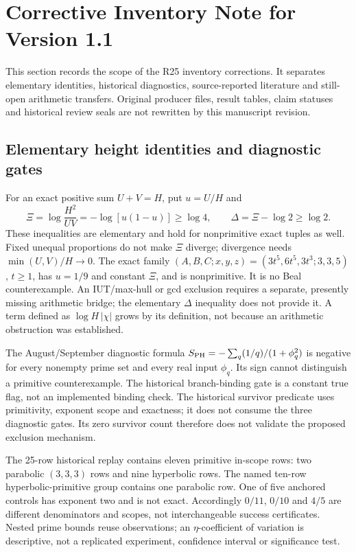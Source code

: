 \documentclass[11pt,a4paper]{article}
\begin{document}
\section{Corrective Inventory Note for Version 1.1}
\label{sec:inventory-corrections}

This section records the scope of the R25 inventory corrections.
It separates elementary identities, historical diagnostics,
source-reported literature and still-open arithmetic transfers.
Original producer files, result tables, claim statuses and historical
review seals are not rewritten by this manuscript revision.

\subsection{Elementary height identities and diagnostic gates}
For an exact positive sum $U+V=H$, put $u=U/H$ and
\[
 \Xi=\log\frac{H^2}{UV}=-\log[u(1-u)]\ge\log4,\qquad
 \Delta=\Xi-\log2\ge\log2.
\]
These inequalities are elementary and hold for nonprimitive exact
tuples as well. Fixed unequal proportions do not make $\Xi$ diverge;
divergence needs $\min(U,V)/H\to0$.
The exact family $(A,B,C;x,y,z)=(3t^5,6t^5,3t^3;3,3,5)$,
$t\ge1$, has $u=1/9$ and constant $\Xi$, and is nonprimitive.
It is no Beal counterexample.
An IUT/max-hull or gcd exclusion requires a separate, presently
missing arithmetic bridge; the elementary $\Delta$ inequality does
not provide it. A term defined as $\log H\,|\chi|$ grows by its
definition, not because an arithmetic obstruction was established.

The August/September diagnostic formula
$S_{\rm PH}=-\sum_q (1/q)/(1+\phi_q^2)$ is negative for every
nonempty prime set and every real input $\phi_q$.
Its sign cannot distinguish a primitive counterexample.
The historical branch-binding gate is a constant true flag, not
an implemented binding check. The historical survivor predicate
uses primitivity, exponent scope and exactness; it does not consume
the three diagnostic gates. Its zero survivor count therefore
does not validate the proposed exclusion mechanism.

The 25-row historical replay contains eleven primitive
in-scope rows: two parabolic $(3,3,3)$ rows and nine hyperbolic
rows. The named ten-row hyperbolic-primitive group contains one
parabolic row. One of five anchored controls has exponent two
and is not exact. Accordingly $0/11$, $0/10$ and $4/5$ are
different denominators and scopes, not interchangeable success
certificates. Nested prime bounds reuse observations; an
$\eta$-coefficient of variation is descriptive, not a replicated
experiment, confidence interval or significance test.
\end{document}
